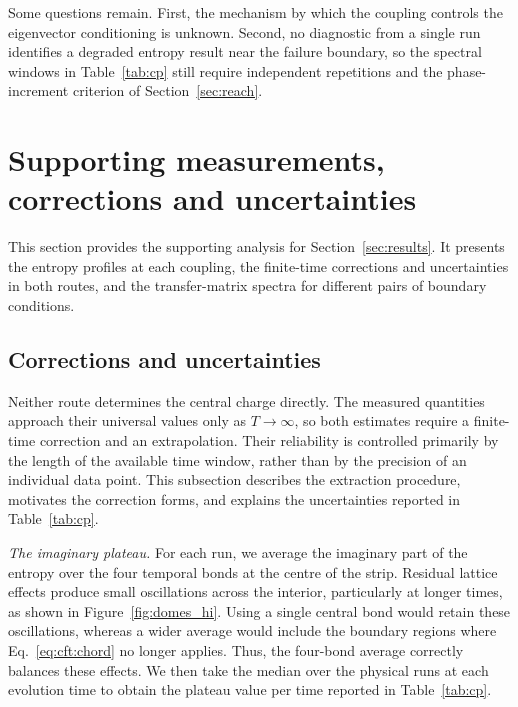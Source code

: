 Some questions remain. First, the mechanism by which the coupling controls the eigenvector conditioning is unknown. Second, no diagnostic from a single run identifies a degraded entropy result near the failure boundary, so the spectral windows in Table~\ref{tab:cp} still require independent repetitions and the phase-increment criterion of Section~\ref{sec:reach}.



\section{Supporting measurements, corrections and uncertainties}
\label{app:extraction}

This section provides the supporting analysis for Section~\ref{sec:results}. It presents the entropy profiles at each coupling, the finite-time corrections and uncertainties in both routes, and the transfer-matrix spectra for different pairs of boundary conditions.

\subsection{Corrections and uncertainties}
\label{app:errors}
\label{app:re}

Neither route determines the central charge directly. The measured quantities approach their universal values only as $T\to\infty$, so both estimates require a finite-time correction and an extrapolation. Their reliability is controlled primarily by the length of the available time window, rather than by the precision of an individual data point. This subsection describes the extraction procedure, motivates the correction forms, and explains the uncertainties reported in Table~\ref{tab:cp}.

\textit{The imaginary plateau.} For each run, we average the imaginary part of the entropy over the four temporal bonds at the centre of the strip. Residual lattice effects produce small oscillations across the interior, particularly at longer times, as shown in Figure~\ref{fig:domes_hi}. Using a single central bond would retain these oscillations, whereas a wider average would include the boundary regions where Eq.~\eqref{eq:cft:chord} no longer applies. Thus, the four-bond average correctly balances these effects. We then take the median over the physical runs at each evolution time to obtain the plateau value per time reported in Table~\ref{tab:cp}.

